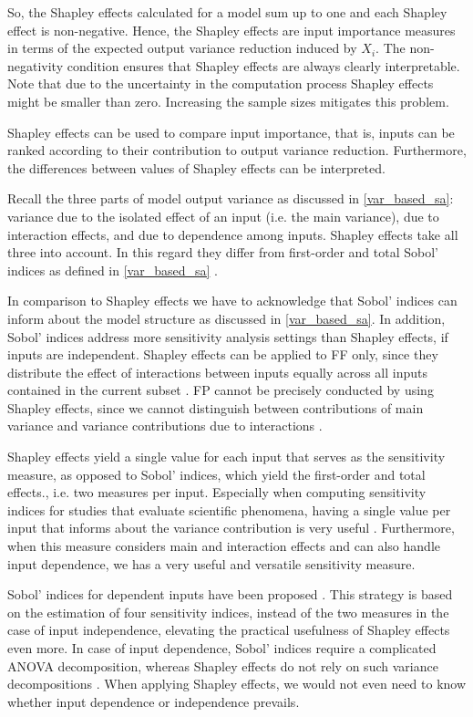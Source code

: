 \noindent So, the Shapley effects calculated for a model sum up to one and each Shapley effect is non-negative. Hence, the Shapley effects are input importance measures in terms of the expected output variance reduction induced by $X_i$. The non-negativity condition ensures that Shapley effects are always clearly interpretable. Note that due to the uncertainty in the computation process Shapley effects might be smaller than zero. Increasing the sample sizes mitigates this problem.

Shapley effects can be used to compare input importance, that is, inputs can be ranked according to their contribution to output variance reduction. Furthermore, the differences between values of Shapley effects can be interpreted.

Recall the three parts of model output variance as discussed in \cref{var_based_sa}: variance due to the isolated effect of an input (i.e. the main variance), due to interaction effects, and due to dependence among inputs. Shapley effects take all three into account. In this regard they differ from first-order and total Sobol' indices as defined in \cref{var_based_sa} \citep{O14}.

In comparison to Shapley effects we have to acknowledge that Sobol' indices can inform about the model structure as discussed in \cref{var_based_sa}. In addition, Sobol' indices address more sensitivity analysis settings than Shapley effects, if inputs are independent. Shapley effects can be applied to FF only, since they distribute the effect of interactions between inputs equally across all inputs contained in the current subset \citep{IP19}. FP cannot be precisely conducted by using Shapley effects, since we cannot distinguish between contributions of main variance and variance contributions due to interactions \citep{IP19}.

Shapley effects yield a single value for each input that serves as the sensitivity measure, as opposed to Sobol' indices, which yield the first-order and total effects., i.e. two measures per input. Especially when computing sensitivity indices for studies that evaluate scientific phenomena, having a single value per input that informs about the variance contribution is very useful \citep{SNS16}. Furthermore, when this measure considers main and interaction effects and can also handle input dependence, we has a very useful and versatile sensitivity measure.

Sobol' indices for dependent inputs have been proposed \citep{MTA15}. This strategy is based on the estimation of four sensitivity indices, instead of the two measures in the case of input independence, elevating the practical usefulness of Shapley effects even more. In case of input dependence, Sobol' indices require a complicated ANOVA decomposition, whereas Shapley effects do not rely on such variance decompositions \citep{IP19}. When applying Shapley effects, we would not even need to know whether input dependence or independence prevails.

